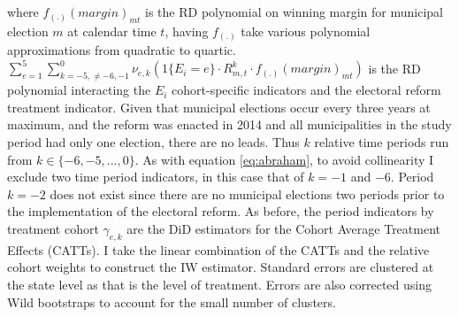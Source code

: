 \documentclass[12pt]{amsart}
\makeatletter
\def\section{\@startsection{section}{1}
	\z@{1.0\linespacing\@plus\linespacing}{.5\linespacing}{\Large}}
\numberwithin{equation}{section}
\theoremstyle{definition}
\theoremstyle{definition}
\theoremstyle{definition}
\makeatother
\begin{document}
where $f_{(.)}(margin)_{mt}$ is the RD polynomial on winning margin for municipal election $m$ at calendar time $t$, having $f_{(.)}$ take various polynomial approximations from quadratic to quartic. $\sum^5_{e=1} \sum^{0}_{k=-5, \neq {-6,-1}} \nu_{e,k}(1\{E_i=e\} \cdot R^k_{m,t} \cdot  f_{(.)}(margin)_{mt} ) $ is the RD polynomial interacting the $E_i$ cohort-specific indicators and the electoral reform treatment indicator. Given that municipal elections occur every three years at maximum, and the reform was enacted in 2014 and all municipalities in the study period had only one election, there are no leads. Thus $k$ relative time periods run from  $k \in\{-6,-5,...,0\}$. As with equation \ref{eq:abraham}, to avoid collinearity I exclude two time period indicators, in this case that of $k=-1$ and $-6$.  Period $k=-2$ does not exist since there are no municipal elections two periods prior to the implementation of the electoral reform. As before, the period indicators by treatment cohort  $\gamma_{e,k}$ are the DiD estimators for the Cohort Average Treatment Effects (CATTs). I take the linear combination of the CATTs and the relative cohort weights to construct the IW estimator. Standard errors are clustered at the state level as that is the level of treatment. Errors are also corrected using Wild bootstraps to account for the small number of clusters. 

\section{Data}
\end{document}
